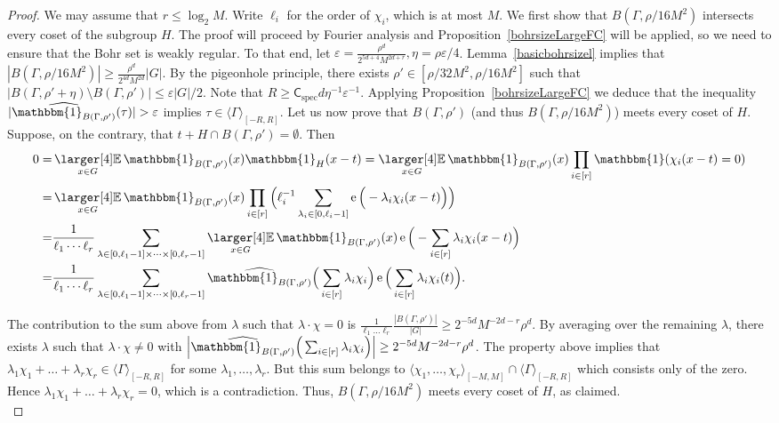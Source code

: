 \documentclass[a4paper,11pt]{article}
\numberwithin{theorem}{section}
\theoremstyle{definition}
\newcommand\id{\mathbbm{1}}
\newcommand{\on}[1]{
	\operatorname{#1}
}
\newcommand{\tdt}{\times\cdots\times}
\newcommand{\exx}{
  \mathop{
    \mathchoice{\vcenter{\hbox{\larger[4]$\mathbb{E}$}}}
               {\kern0pt\mathbb{E}}
               {\kern0pt\mathbb{E}}
               {\kern0pt\mathbb{E}}
  }\displaylimits
}
\begin{document}
\begin{proof} We may assume that $r \leq \log_2 M$. Write $\ell_i$ for the order of $\chi_i$, which is at most $M$. We first show that $B(\Gamma, \rho / 16M^2)$ intersects every coset of the subgroup $H$. The proof will proceed by Fourier analysis and Proposition~\ref{bohrsizeLargeFC} will be applied, so we need to ensure that the Bohr set is weakly regular. To that end, let $\varepsilon = \frac{\rho^d }{ 2^{5d +4}M^{2d + r}}, \eta = \rho \varepsilon / 4$. Lemma~\ref{basicbohrsizel} implies that $|B(\Gamma, \rho / 16M^2)| \geq \frac{\rho^d}{2^{4d}M^{2d}} |G|$. By the pigeonhole principle, there exists $\rho' \in [\rho / 32M^2, \rho / 16M^2]$ such that $|B(\Gamma, \rho' + \eta) \setminus B(\Gamma, \rho')| \leq \varepsilon |G| / 2$. Note that $R \geq \mathsf{C}_{\on{spec}} d \eta^{-1} \varepsilon^{-1}$. Applying Proposition~\ref{bohrsizeLargeFC} we deduce that the inequality $|\widehat{\id_{B(\Gamma, \rho')}}(\tau)| > \varepsilon$ implies $\tau \in \langle \Gamma \rangle_{[-R, R]}$. Let us now prove that $B(\Gamma, \rho')$ (and thus $B(\Gamma, \rho / 16M^2)$) meets every coset of $H$.\\

Suppose, on the contrary, that $t + H \cap B(\Gamma, \rho') = \emptyset$. Then
\begin{align*}0 = &\exx_{x \in G} \id_{B(\Gamma, \rho')}(x) \id_H(x-t) =  \exx_{x \in G} \id_{B(\Gamma, \rho')}(x) \prod_{i \in [r]} \id(\chi_i(x - t) = 0) \\
= &\exx_{x \in G} \id_{B(\Gamma, \rho')}(x) \prod_{i \in [r]} \Big(\ell_i^{-1} \sum_{\lambda_i \in [0, \ell_i-1]} \on{e}\Big(-\lambda_i \chi_i(x -t)\Big)\Big)\\
= & \frac{1}{\ell_1\cdots\ell_r}\sum_{\lambda \in [0, \ell_1 - 1] \tdt [0, \ell_r - 1]} \exx_{x \in G} \id_{B(\Gamma, \rho')}(x) \on{e}\Big(-\sum_{i \in [r]}\lambda_i \chi_i(x-t)\Big)\\
= & \frac{1}{\ell_1\cdots\ell_r}\sum_{\lambda \in [0, \ell_1 - 1] \tdt [0, \ell_r - 1]} \widehat{\id_{B(\Gamma, \rho')}}\Big(\sum_{i \in [r]}\lambda_i \chi_i\Big)\on{e}\Big(\sum_{i \in [r]}\lambda_i \chi_i(t)\Big).
\end{align*}

The contribution to the sum above from $\lambda$ such that $\lambda \cdot \chi = 0$ is $\frac{1}{\ell_1 \dots \ell_r}\frac{|B(\Gamma, \rho')|}{|G|} \geq 2^{-5d} M^{-2d-r} \rho^d$. By averaging over the remaining $\lambda$, there exists $\lambda$ such that $\lambda \cdot \chi \not= 0$ with $\Big|\widehat{\id_{B(\Gamma, \rho')}}\Big(\sum_{i \in [r]}\lambda_i \chi_i\Big)\Big| \geq 2^{-5d} M^{-2d-r} \rho^d$. The property above implies that $\lambda_1\chi_1 + \dots + \lambda_r \chi_r \in \langle \Gamma \rangle_{[-R, R]}$ for some $\lambda_1, \dots, \lambda_r$. But this sum belongs to $\langle\chi_1, \dots, \chi_r \rangle_{[-M, M]} \cap \langle \Gamma \rangle_{[-R, R]}$ which consists only of the zero. Hence $\lambda_1\chi_1 + \dots + \lambda_r \chi_r  = 0$, which is a contradiction. Thus, $B(\Gamma, \rho / 16M^2)$ meets every coset of $H$, as claimed.\\



\end{proof}
\end{document}
